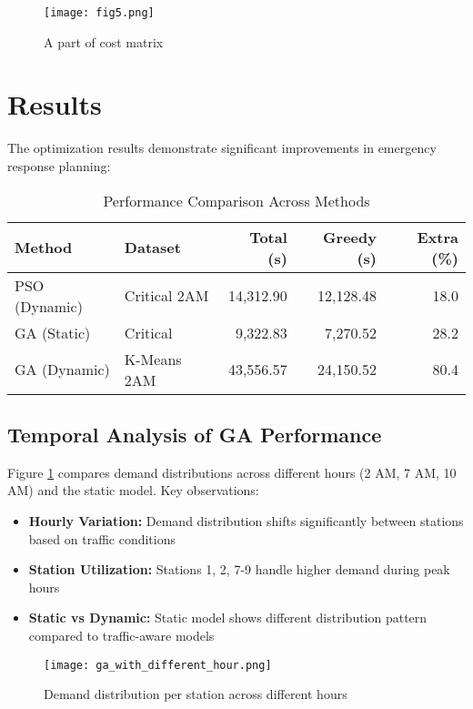 \documentclass[conference]{IEEEtran}
\begin{document}
\begin{figure}[H] 
    \centering
    \texttt{[image: fig5.png]}
    \caption{A part of cost matrix}
\end{figure}





\section*{\textbf{Results}}
The optimization results demonstrate significant improvements in emergency response planning:

\begin{table}[htbp]
\centering
\footnotesize
\caption{Performance Comparison Across Methods}
\label{tab:overall_results}
\begin{tabular}{@{}l l r r r@{}}
\toprule
\textbf{Method} & \textbf{Dataset} & \textbf{Total (s)} & \textbf{Greedy (s)} & \textbf{Extra (\%)} \\
\midrule
PSO (Dynamic) & Critical 2AM & 14,312.90 & 12,128.48 & 18.0 \\
GA (Static) & Critical & 9,322.83 & 7,270.52 & 28.2 \\
GA (Dynamic) & K-Means 2AM & 43,556.57 & 24,150.52 & 80.4 \\
\bottomrule
\end{tabular}
\end{table}

\subsection*{Temporal Analysis of GA Performance}
Figure \ref{fig:ga_demand_dist} compares demand distributions across different hours (2 AM, 7 AM, 10 AM) and the static model. Key observations:
\begin{itemize}
    \item \textbf{Hourly Variation:} Demand distribution shifts significantly between stations based on traffic conditions
    \item \textbf{Station Utilization:} Stations 1, 2, 7-9 handle higher demand during peak hours
    \item \textbf{Static vs Dynamic:} Static model shows different distribution pattern compared to traffic-aware models
\end{itemize}

\begin{figure}[htbp]
    \centering
    \texttt{[image: ga\_with\_different\_hour.png]}
    \caption{Demand distribution per station across different hours}
    \label{fig:ga_demand_dist}
\end{figure}
\end{document}
